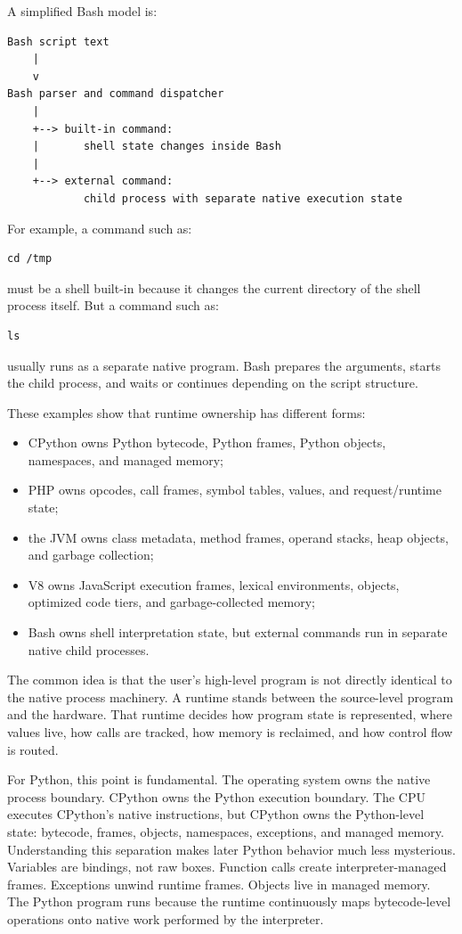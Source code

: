 \documentclass[a4paper,twoside]{report}
\begin{document}
A simplified Bash model is:

\begin{verbatim}
Bash script text
    |
    v
Bash parser and command dispatcher
    |
    +--> built-in command:
    |       shell state changes inside Bash
    |
    +--> external command:
            child process with separate native execution state
\end{verbatim}

For example, a command such as:

\begin{verbatim}
cd /tmp
\end{verbatim}

must be a shell built-in because it changes the current directory of the shell process itself. But a command such as:

\begin{verbatim}
ls
\end{verbatim}

usually runs as a separate native program. Bash prepares the arguments, starts the child process, and waits or continues depending on the script structure.

These examples show that runtime ownership has different forms:

\begin{itemize}
    \item CPython owns Python bytecode, Python frames, Python objects, namespaces, and managed memory;
    \item PHP owns opcodes, call frames, symbol tables, values, and request/runtime state;
    \item the JVM owns class metadata, method frames, operand stacks, heap objects, and garbage collection;
    \item V8 owns JavaScript execution frames, lexical environments, objects, optimized code tiers, and garbage-collected memory;
    \item Bash owns shell interpretation state, but external commands run in separate native child processes.
\end{itemize}

The common idea is that the user's high-level program is not directly identical to the native process machinery. A runtime stands between the source-level program and the hardware. That runtime decides how program state is represented, where values live, how calls are tracked, how memory is reclaimed, and how control flow is routed.

For Python, this point is fundamental. The operating system owns the native process boundary. CPython owns the Python execution boundary. The CPU executes CPython's native instructions, but CPython owns the Python-level state: bytecode, frames, objects, namespaces, exceptions, and managed memory. Understanding this separation makes later Python behavior much less mysterious. Variables are bindings, not raw boxes. Function calls create interpreter-managed frames. Exceptions unwind runtime frames. Objects live in managed memory. The Python program runs because the runtime continuously maps bytecode-level operations onto native work performed by the interpreter.
\end{document}
